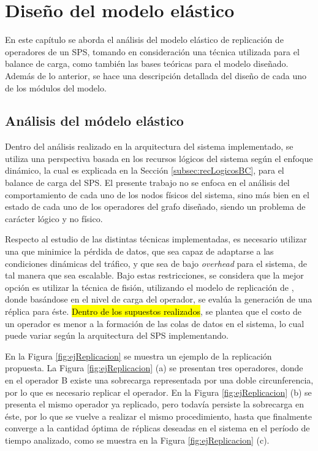 \chapter{Dise\~no del modelo elástico}
\label{cap:disenoSistema}

En este capítulo se aborda el análisis del modelo elástico de replicación de operadores de un SPS, tomando en consideración una técnica utilizada para el balance de carga, como también las bases teóricas para el modelo diseñado. Además de lo anterior, se hace una descripción detallada del diseño de cada uno de los módulos del modelo.

\section{Análisis del módelo elástico}
Dentro del análisis realizado en la arquitectura del sistema implementado, se utiliza una perspectiva basada en los recursos lógicos del sistema según el enfoque dinámico, la cual es explicada en la Sección \ref{subsec:recLogicosBC}, para el balance de carga del SPS. El presente trabajo no se enfoca en el análisis del comportamiento de cada uno de los nodos físicos del sistema, sino más bien en el estado de cada uno de los operadores del grafo diseñado, siendo un problema de carácter lógico y no físico.

Respecto al estudio de las distintas técnicas implementadas, es necesario utilizar una que minimice la pérdida de datos, que sea capaz de adaptarse a las condiciones dinámicas del tráfico, y que sea de bajo \textit{overhead} para el sistema, de tal manera que sea escalable. Bajo estas restricciones, se considera que la mejor opción es utilizar la técnica de fisión, utilizando el modelo de replicación de \citep{FernandezMKP13}, donde basándose en el nivel de carga del operador, se evalúa la generación de una réplica para éste. \hl{Dentro de los supuestos realizados}, se plantea que el costo de un operador es menor a la formación de las colas de datos en el sistema, lo cual puede variar según la arquitectura del SPS implementando.

En la Figura \ref{fig:ejReplicacion} se muestra un ejemplo de la replicación propuesta. La Figura \ref{fig:ejReplicacion} (a) se presentan tres operadores, donde en el operador B existe una sobrecarga representada por una doble circunferencia, por lo que es necesario replicar el operador. En la Figura \ref{fig:ejReplicacion} (b) se presenta el mismo operador ya replicado, pero todavía persiste la sobrecarga en éste, por lo que se vuelve a realizar el mismo procedimiento, hasta que finalmente converge a la cantidad óptima de réplicas deseadas en el sistema en el período de tiempo analizado, como se muestra en la Figura \ref{fig:ejReplicacion} (c).

